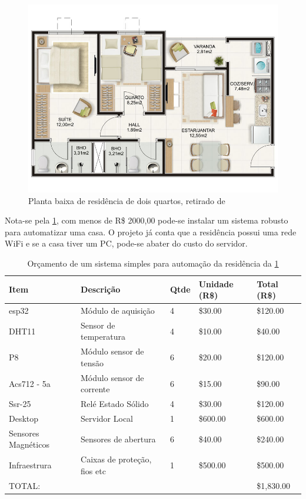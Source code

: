 \begin{figure}[h!]
\centering
\includegraphics[width=13cm]{./02_Capitulos/02_Cap5/figures/planta-casa}
\caption{Planta baixa de residência de dois quartos, retirado de \cite{decorandocasas}}
\label{fig:5.1.0/planta-casa}
\end{figure}

Nota-se pela \ref{table:planta-casa}, com menos de R\$ 2000,00 pode-se instalar um sistema robusto para automatizar uma casa. O projeto já conta que a residência possui uma rede WiFi e se a casa tiver um PC, pode-se abater do custo do servidor.


\begin{table}[h!]
\centering
\caption{Orçamento de um sistema simples para automação da residência da \ref{fig:5.1.0/planta-casa}}
\begin{tabular}{|l|l|l|l|l|}
\hline
Item                & Descrição                    & Qtde & Unidade (R\$) & Total (R\$) \\ \hline
esp32               & Módulo de aquisição          & 4    & \$30.00       & \$120.00    \\ \hline
DHT11               & Sensor de temperatura        & 4    & \$10.00       & \$40.00     \\ \hline
P8                  & Módulo sensor de tensão      & 6    & \$20.00       & \$120.00    \\ \hline
Acs712 - 5a         & Módulo sensor de corrente    & 6    & \$15.00       & \$90.00     \\ \hline
Ssr-25              & Relé Estado Sólido           & 4    & \$30.00       & \$120.00    \\ \hline
Desktop             & Servidor Local               & 1    & \$600.00      & \$600.00    \\ \hline
Sensores Magnéticos & Sensores de abertura         & 6    & \$40.00       & \$240.00    \\ \hline
Infraestrura        & Caixas de proteção, fios etc & 1    & \$500.00      & \$500.00    \\ \hline
\multicolumn{4}{|l|}{TOTAL:}                                              & \$1,830.00  \\ \hline
\end{tabular}
\label{table:planta-casa}
\end{table}


